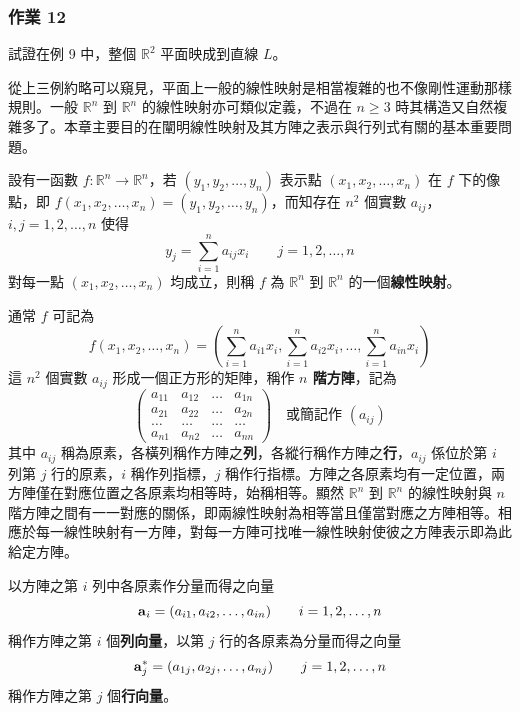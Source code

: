 \subsubsection*{作業 12}\label{hw:b6s-1-12}
試證在例 9 中，整個 $\mathbb{R}^2$ 平面映成到直線 $L$。

從上三例約略可以窺見，平面上一般的線性映射是相當複雜的也不像剛性運動那樣規則。一般 $\mathbb{R}^n$ 到 $\mathbb{R}^n$ 的線性映射亦可類似定義，不過在 $n \ge 3$ 時其構造又自然複雜多了。本章主要目的在闡明線性映射及其方陣之表示與行列式有關的基本重要問題。

\begin{definition}\label{def:b6s-1-3}
設有一函數 $f: \mathbb{R}^n \longrightarrow \mathbb{R}^n$，若 $(y_1, y_2, \dots, y_n)$ 表示點 $(x_1, x_2, \dots, x_n)$ 在 $f$ 下的像點，即 $f(x_1, x_2, \dots, x_n) = (y_1, y_2, \dots, y_n)$，而知存在 $n^2$ 個實數 $a_{ij}$，$i, j = 1, 2, \dots, n$ 使得
\begin{equation}
y_j = \sum_{i=1}^n a_{ij} x_i \qquad j = 1, 2, \dots, n \label{eq:b6s-1-1-11}
\end{equation}
對每一點 $(x_1, x_2, \dots, x_n)$ 均成立，則稱 $f$ 為 $\mathbb{R}^n$ 到 $\mathbb{R}^n$ 的一個\textbf{線性映射}。
\end{definition}

通常 $f$ 可記為
\[ f(x_1, x_2, \dots, x_n) = \left( \sum_{i=1}^n a_{i1} x_i, \sum_{i=1}^n a_{i2} x_i, \dots, \sum_{i=1}^n a_{in} x_i \right) \]
這 $n^2$ 個實數 $a_{ij}$ 形成一個正方形的矩陣，稱作 \textbf{$n$ 階方陣}，記為
\begin{equation}
\begin{pmatrix}
a_{11} & a_{12} & \dots & a_{1n} \\
a_{21} & a_{22} & \dots & a_{2n} \\
\dots & \dots & \dots & \dots \\
a_{n1} & a_{n2} & \dots & a_{nn}
\end{pmatrix} \quad \text{或簡記作 } (a_{ij}) \label{eq:b6s-1-1-12}
\end{equation}
其中 $a_{ij}$ 稱為原素，各橫列稱作方陣之\textbf{列}，各縱行稱作方陣之\textbf{行}，$a_{ij}$ 係位於第 $i$ 列第 $j$ 行的原素，$i$ 稱作列指標，$j$ 稱作行指標。方陣之各原素均有一定位置，兩方陣僅在對應位置之各原素均相等時，始稱相等。顯然 $\mathbb{R}^n$ 到 $\mathbb{R}^n$ 的線性映射與 $n$ 階方陣之間有一一對應的關係，即兩線性映射為相等當且僅當對應之方陣相等。相應於每一線性映射有一方陣，對每一方陣可找唯一線性映射使彼之方陣表示即為此給定方陣。

以方陣之第 $i$ 列中各原素作分量而得之向量
\begin{equation}
\boldsymbol{\mathbf{a}}_i = (a_{i1}, a_{i2}, \dots, a_{in}) \qquad i=1, 2, \dots, n \label{eq:b6s-1-1-13}
\end{equation}
稱作方陣之第 $i$ 個\textbf{列向量}，以第 $j$ 行的各原素為分量而得之向量
\begin{equation}
\boldsymbol{\mathbf{a}}_j^* = (a_{1j}, a_{2j}, \dots, a_{nj}) \qquad j=1, 2, \dots, n \label{eq:b6s-1-1-14}
\end{equation}
稱作方陣之第 $j$ 個\textbf{行向量}。

